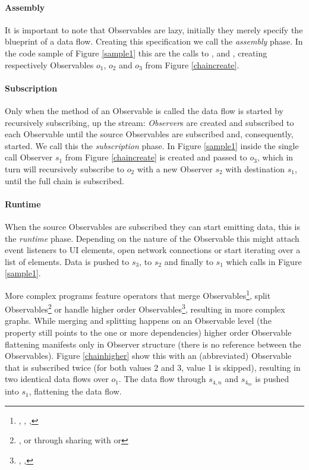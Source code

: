\paragraph{Assembly} It is important to note that Observables are lazy, initially they merely specify the blueprint of a data flow. 
Creating this specification we call the \textit{assembly} phase. In the code sample of Figure \ref{sample1} this are the calls to ,  and , creating respectively Observables $o_1$, $o_2$ and $o_3$ from Figure \ref{chaincreate}.

\paragraph{Subscription} Only when the  method of an Observable is called the data flow is started by recursively subscribing, up the stream: \textit{Observer}s are created and subscribed to each Observable until the source Observables are subscribed and, consequently, started. We call this the \textit{subscription} phase. In Figure \ref{sample1} inside the single  call Observer $s_1$ from Figure \ref{chaincreate} is created and passed to $o_3$, which in turn will recursively subscribe to $o_2$ with a new Observer $s_2$ with destination $s_1$, until the full chain is subscribed.

\paragraph{Runtime} When the source Observables are subscribed they can start emitting data, this is the \textit{runtime} phase. Depending on the nature of the Observable this might attach event listeners to UI elements, open network connections or start iterating over a list of elements. Data is pushed to $s_3$, to $s_2$ and finally to $s_1$ which calls  in Figure \ref{sample1}.

More complex programs feature operators that merge Observables\footnote{
	, , , 
}, split Observables\footnote{
	, or through sharing with  or 
} or handle higher order Observables\footnote{
	, , 
}, resulting in more complex graphs. While merging and splitting happens on an Observable level (the  property still points to the one or more dependencies) higher order Observable flattening manifests only in Observer structure (there is no reference between the Observables). Figure \ref{chainhigher} show this with an (abbreviated)  Observable that is subscribed twice (for both values $2$ and $3$, value 1 is skipped), resulting in two identical data flows over $o_1$. The data flow through $s_{4,n}$ and $s_{4_m}$ is pushed into $s_1$, flattening the data flow. 
